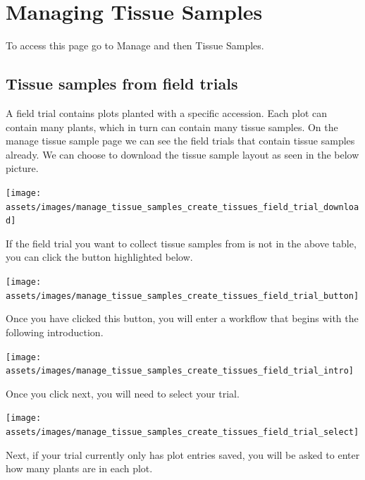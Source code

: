 \documentclass[
  12pt,
]{book}
\begin{document}
\hypertarget{managing-tissue-samples}{%
\chapter{Managing Tissue Samples}\label{managing-tissue-samples}}

To access this page go to Manage and then Tissue Samples.

\hypertarget{tissue-samples-from-field-trials}{%
\section{Tissue samples from field trials}\label{tissue-samples-from-field-trials}}

A field trial contains plots planted with a specific accession. Each plot can contain many plants, which in turn can contain many tissue samples. On the manage tissue sample page we can see the field trials that contain tissue samples already. We can choose to download the tissue sample layout as seen in the below picture.

\begin{center}\texttt{[image: assets/images/manage\_tissue\_samples\_create\_tissues\_field\_trial\_download]} \end{center}

If the field trial you want to collect tissue samples from is not in the above table, you can click the button highlighted below.

\begin{center}\texttt{[image: assets/images/manage\_tissue\_samples\_create\_tissues\_field\_trial\_button]} \end{center}

Once you have clicked this button, you will enter a workflow that begins with the following introduction.

\begin{center}\texttt{[image: assets/images/manage\_tissue\_samples\_create\_tissues\_field\_trial\_intro]} \end{center}

Once you click next, you will need to select your trial.

\begin{center}\texttt{[image: assets/images/manage\_tissue\_samples\_create\_tissues\_field\_trial\_select]} \end{center}

Next, if your trial currently only has plot entries saved, you will be asked to enter how many plants are in each plot.
\end{document}
